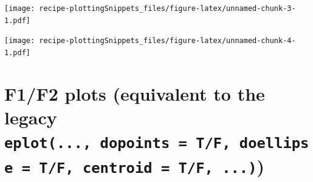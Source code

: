 \documentclass[]{book}
\newenvironment{Shaded}{\begin{snugshade}}{\end{snugshade}}
\newcommand{\CommentTok}[1]{\textcolor[rgb]{0.56,0.35,0.01}{\textit{#1}}}
\newcommand{\DataTypeTok}[1]{\textcolor[rgb]{0.13,0.29,0.53}{#1}}
\newcommand{\KeywordTok}[1]{\textcolor[rgb]{0.13,0.29,0.53}{\textbf{#1}}}
\newcommand{\NormalTok}[1]{#1}
\newcommand{\OperatorTok}[1]{\textcolor[rgb]{0.81,0.36,0.00}{\textbf{#1}}}
\newcommand{\StringTok}[1]{\textcolor[rgb]{0.31,0.60,0.02}{#1}}
\begin{document}
\texttt{[image: recipe-plottingSnippets\_files/figure-latex/unnamed-chunk-3-1.pdf]}

\begin{Shaded}
\end{Shaded}

\texttt{[image: recipe-plottingSnippets\_files/figure-latex/unnamed-chunk-4-1.pdf]}

\hypertarget{f1f2-plots-equivalent-to-the-legacy-eplot...-dopoints-tf-doellipse-tf-centroid-tf-...}{%
\section{\texorpdfstring{F1/F2 plots (equivalent to the legacy \texttt{eplot(...,\ dopoints\ =\ T/F,\ doellipse\ =\ T/F,\ centroid\ =\ T/F,\ ...)})}{F1/F2 plots (equivalent to the legacy eplot(..., dopoints = T/F, doellipse = T/F, centroid = T/F, ...))}}\label{f1f2-plots-equivalent-to-the-legacy-eplot...-dopoints-tf-doellipse-tf-centroid-tf-...}}
\end{document}
